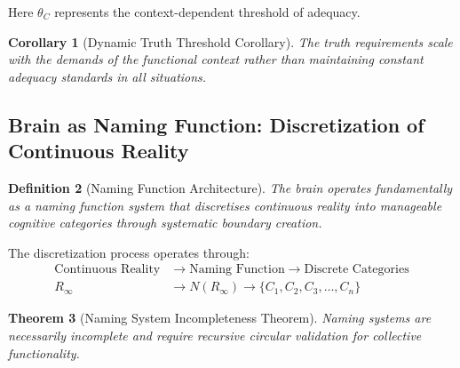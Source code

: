 \documentclass[12pt,a4paper]{article}
\newtheorem{theorem}{Theorem}[section]
\newtheorem{corollary}[theorem]{Corollary}
\newtheorem{definition}[theorem]{Definition}
\begin{document}
Here $\theta_C$ represents the context-dependent threshold of adequacy.

\begin{corollary}[Dynamic Truth Threshold Corollary]
The truth requirements scale with the demands of the functional context rather than maintaining constant adequacy standards in all situations.
\end{corollary}

\subsection{Brain as Naming Function: Discretization of Continuous Reality}

\begin{definition}[Naming Function Architecture]
The brain operates fundamentally as a naming function system that discretises continuous reality into manageable cognitive categories through systematic boundary creation.
\end{definition}

The discretization process operates through:
\begin{align}
\text{Continuous Reality} &\rightarrow \text{Naming Function} \rightarrow \text{Discrete Categories} \\
R_{\infty} &\rightarrow N(R_{\infty}) \rightarrow \{C_1, C_2, C_3, \ldots, C_n\}
\end{align}

\begin{theorem}[Naming System Incompleteness Theorem]
Naming systems are necessarily incomplete and require recursive circular validation for collective functionality.
\end{theorem}
\end{document}
